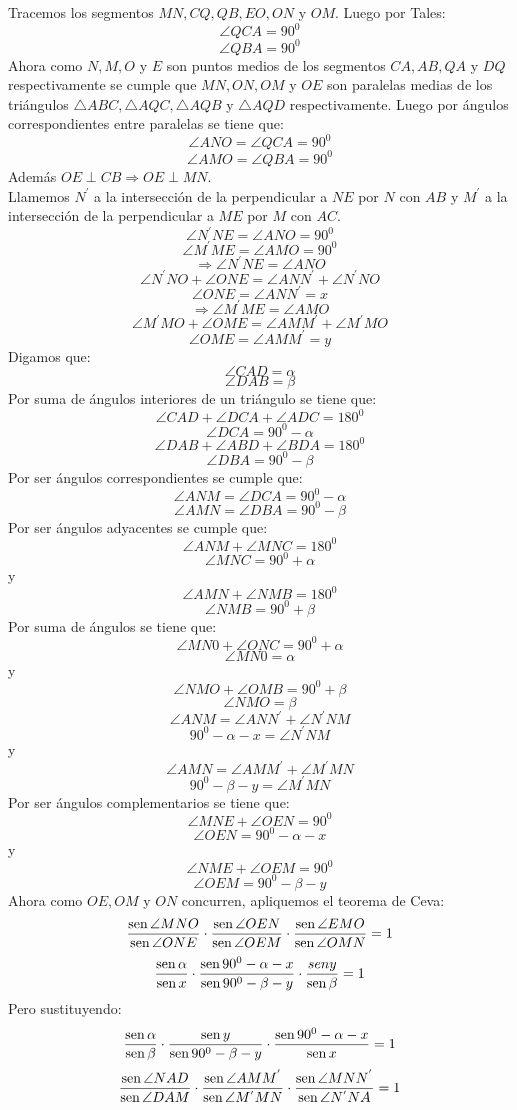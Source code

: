 \documentclass{book}
\newcommand{\sen}{\mathop{\rm sen}\nolimits} %
\begin{document}
\begin{enumerate}
\begin{center}
					\end{center}
			Tracemos los segmentos $MN,CQ,QB,EO,ON$ y $OM$. Luego por Tales:
$$\angle QCA=90^0$$
$$\angle QBA=90^0$$
Ahora como $N,M,O$ y $E$ son puntos medios de los segmentos $CA,AB,QA$ y $DQ$ respectivamente se cumple que $MN,ON,OM$ y $OE$ son paralelas medias de los triángulos $\triangle ABC,\triangle AQC,\triangle AQB$ y $\triangle AQD$ respectivamente. Luego por ángulos correspondientes entre paralelas se tiene que:
$$\angle ANO=\angle QCA=90^0$$
$$\angle AMO=\angle QBA=90^0$$
Además $OE\perp CB\Rightarrow OE\perp MN$.\\
Llamemos $N^{'}$ a la intersección de la perpendicular a $NE$ por $N$ con $AB$ y  $M^{'}$ a la intersección de la perpendicular a $ME$ por $M$ con $AC$.
$$\angle N^{'} NE=\angle ANO=90^0$$
$$\angle M^{'} ME=\angle AMO=90^0$$
$$\Rightarrow\angle N^{'}NE=\angle ANO$$
$$\angle N^{'} NO+\angle ONE=\angle ANN^{'}+\angle N^{'} NO$$
$$\angle ONE=\angle ANN^{'}=x$$
$$\Rightarrow\angle M^{'} ME=\angle AMO$$
$$\angle M^{'} MO+\angle OME=\angle AMM^{'}+\angle M^{'} MO$$
$$\angle OME=\angle AMM^{'}=y$$
Digamos que:
$$\angle CAD=\alpha$$
$$\angle DAB=\beta$$
Por suma de ángulos interiores de un triángulo se tiene que:
$$\angle CAD+\angle DCA+\angle ADC=180^0$$
$$\angle DCA=90^0-\alpha$$
$$\angle DAB+\angle ABD+\angle BDA=180^0$$
$$\angle DBA=90^0-\beta$$
Por ser ángulos correspondientes se cumple que:
$$\angle ANM=\angle DCA=90^0-\alpha$$
$$\angle AMN=\angle DBA=90^0-\beta$$
Por ser ángulos adyacentes se cumple que:
$$\angle ANM+\angle MNC=180^0$$
$$\angle MNC=90^0+\alpha$$
y
$$\angle AMN+\angle NMB=180^0$$
$$\angle NMB=90^0+ \beta$$
Por suma de ángulos se tiene que:
$$\angle MN0+\angle ONC=90^0+\alpha$$
$$\angle MN0=\alpha$$
y
$$\angle NMO+\angle OMB=90^0+ \beta$$
$$\angle NMO=\beta$$
$$\angle ANM=\angle ANN^{'}+\angle N^{'}NM$$
$$90^0-\alpha-x=\angle N^{'}NM$$
y
$$\angle AMN=\angle AMM^{'}+\angle M^{'}MN$$
$$90^0-\beta-y=\angle M^{'}MN$$
Por ser ángulos complementarios se tiene que:
$$\angle MNE+\angle OEN=90^0$$
$$\angle OEN=90^0-\alpha-x$$
y
$$\angle NME+\angle OEM=90^0$$
$$\angle OEM=90^0-\beta-y$$
Ahora como $OE,OM$ y $ON$ concurren, apliquemos el teorema de Ceva:
$${\sen {\angle MNO}\over\sen {\angle ONE}}\cdot{\sen {\angle OEN}\over\sen {\angle OEM}}\cdot{\sen {\angle EMO}\over\sen {\angle OMN}}=1$$
$${\sen \alpha\over\sen x}\cdot{\sen {90^0-\alpha-x}\over\sen {90^0-\beta-y}}\cdot{sen y\over\sen \beta}=1$$
Pero sustituyendo:
$${\sen \alpha\over\sen \beta}\cdot{\sen y\over\sen {90^0-\beta-y}}\cdot{\sen {90^0-\alpha-x}\over\sen x}=1$$
$${\sen {\angle NAD}\over\sen {\angle DAM}}\cdot{\sen {\angle AMM^{'}}\over\sen {\angle M^{'} MN}}\cdot{\sen {\angle MNN^{'}}\over\sen {\angle N^{'} NA}}=1$$

\end{enumerate}
\end{document}
